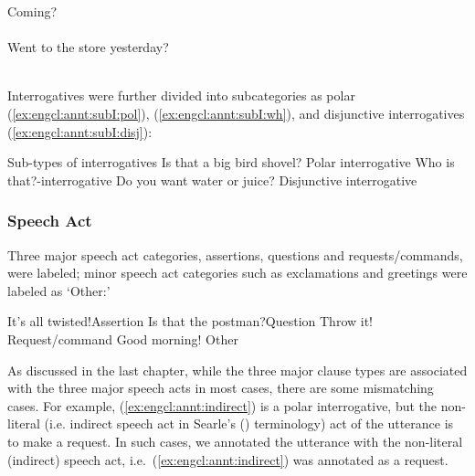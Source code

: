 \bxl\label{ex:engcl:annt:disamb:dec} Coming? \\
\cmark {}\\
\xmark {}
\ex \label{ex:engcl:annt:disamb:int} Went to the store yesterday? \\
\cmark {}\\
\xmark {}
\exl
\eex

Interrogatives were further divided into subcategories as polar (\ref{ex:engcl:annt:subI:pol}), \twh{} (\ref{ex:engcl:annt:subI:wh}), and disjunctive interrogatives (\ref{ex:engcl:annt:subI:disj}):

	Sub-types of interrogatives
\bxl\label{ex:engcl:annt:subI:pol}
Is that a big bird shovel? \hfill	Polar interrogative
\ex\label{ex:engcl:annt:subI:wh}	Who is that?\hfill	\twh-interrogative
\ex\label{ex:engcl:annt:subI:disj}	Do you want water or juice? \hfill Disjunctive interrogative
\exl
\eex

\subsubsection{Speech Act}

Three major speech act categories, assertions, questions and requests/commands, were labeled;
minor speech act categories such as exclamations and greetings were labeled as `Other:' 

\bxl\label{ex:engcl:annt:sp:a} It’s all twisted!\hfill	Assertion
\ex\label{ex:engcl:annt:sp:q} Is that the postman?\hfill		Question
\ex\label{ex:engcl:annt:sp:r} Throw it!	\hfill		Request/command
\ex \label{ex:engcl:annt:sp:o} Good morning! \hfill Other
\exl
\eex

As discussed in the last chapter, while the three major clause types are associated with the three major speech acts in most cases, there are some mismatching cases. For example, (\ref{ex:engcl:annt:indirect}) is a polar interrogative, but the non-literal (i.e. indirect speech act in Searle's (\cite*{searle1975indirect}) terminology) act of the utterance is to make a request.
In such cases, we annotated the utterance with the non-literal (indirect) speech act, i.e.\ (\ref{ex:engcl:annt:indirect}) was annotated as a request.

